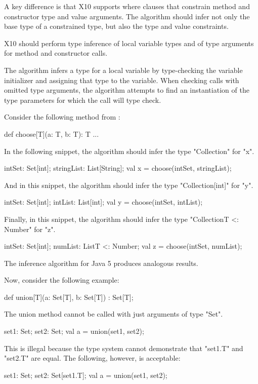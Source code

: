 \documentclass[preprint,nocopyrightspace,9pt]{sigplanconf}
\begin{document}
A key difference is that X10 supports where clauses that
constrain method and constructor type and value arguments.
The algorithm should infer not only the base type of a
constrained type, but also the type and value constraints.


X10 should perform type inference of local variable
types and of type arguments for method and constructor calls.%

The algorithm infers a type for a local variable by
type-checking the variable initializer and assigning
that type to the variable.
When checking calls with omitted type arguments,
the algorithm attempts to find an instantiation of the type
parameters for which the call will type check.
\fi

Consider the following method from \cite{adding-wildcards}:
\begin{xten}
def choose[T](a: T, b: T): T { ... }
\end{xten}
%
In the following snippet, the algorithm should infer the type
\xcd"Collection" for \xcd"x".
\begin{xten}
intSet: Set[int];
stringList: List[String];
val x = choose(intSet, stringList);
\end{xten}
%
And in this snippet, the algorithm should infer the type
\xcd"Collection[int]" for \xcd"y".
\begin{xten}
intSet: Set[int];
intList: List[int];
val y = choose(intSet, intList);
\end{xten}
%
Finally, in this snippet, the algorithm should infer the type
\xcd"Collection{T <: Number}" for \xcd"z".
\begin{xten}
intSet: Set[int];
numList: List{T <: Number};
val z = choose(intSet, numList);
\end{xten}
The inference algorithm for Java 5 produces analogous results.

Now, consider the following example:
\begin{xten}
def union[T](a: Set[T], b: Set[T]) : Set[T];
\end{xten}
The union method cannot be called with just arguments of type \xcd"Set".
\begin{xten}
set1: Set;
set2: Set;
val a = union(set1, set2);
\end{xten}
This is illegal because the type system cannot demonstrate that
\xcd"set1.T" and \xcd"set2.T" are equal.
The following, however, is acceptable:
\begin{xten}
set1: Set;
set2: Set[set1.T];
val a = union(set1, set2);
\end{xten}
\end{document}

